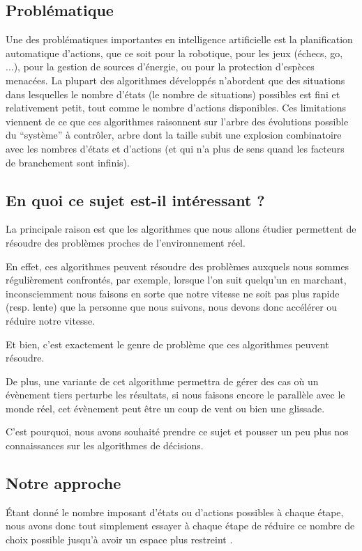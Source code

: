 \documentclass[pdftex,french, english]{article}	%
\begin{document}
	\subsection{Problématique}
	Une des problématiques importantes en intelligence artificielle est la planification automatique d’actions, que ce soit pour la robotique, pour les jeux (échecs, go, ...), pour la gestion de sources d’énergie, ou pour la protection d’espèces menacées. La plupart des algorithmes développés n’abordent que des situations dans lesquelles le nombre d’états (le nombre de situations) possibles est fini et relativement petit, tout comme le nombre d’actions disponibles. Ces limitations viennent de ce que ces algorithmes raisonnent sur l’arbre des évolutions possible du “système” à contrôler, arbre dont la taille subit une explosion combinatoire avec les nombres d’états et d’actions (et qui n’a plus de sens quand les facteurs de branchement sont infinis).
	\subsection{En quoi ce sujet est-il intéressant ?}

	La principale raison est que les algorithmes que nous allons étudier permettent de résoudre des problèmes proches de l'environnement réel.

	En effet, ces algorithmes peuvent résoudre des problèmes auxquels nous sommes régulièrement confrontés, par exemple, lorsque l'on suit quelqu'un en marchant, inconsciemment nous faisons en sorte que notre vitesse ne soit pas plus rapide (resp. lente) que la personne que nous suivons, nous devons donc accélérer ou réduire notre vitesse.

	Et bien, c'est exactement le genre de problème que ces algorithmes peuvent résoudre.

	De plus, une variante de cet algorithme permettra de gérer des cas où un évènement tiers perturbe les résultats, si nous faisons encore le parallèle avec le monde réel, cet évènement peut être un coup de vent ou bien une glissade.

	C'est pourquoi, nous avons souhaité prendre ce sujet et pousser un peu plus nos connaissances sur les algorithmes de décisions.
	
	\subsection{Notre approche}
	Étant donné le nombre imposant d'états ou d'actions possibles à chaque étape, nous avons donc tout simplement essayer à chaque étape de réduire ce nombre de choix possible jusqu'à avoir un espace plus restreint \cite{couetoux01}.
\end{document}
